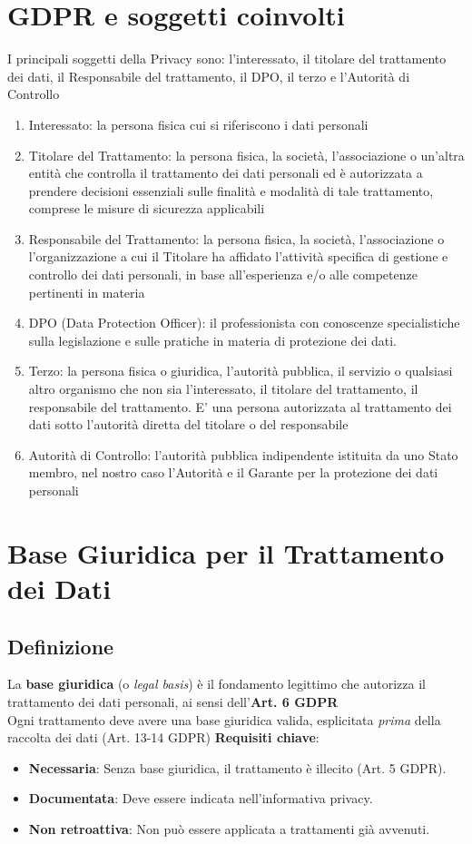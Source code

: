 \documentclass[8pt,oneside,a4paper]{article}
\begin{document}
	\section{GDPR e soggetti coinvolti}
	I  principali soggetti della Privacy sono: l’interessato, il titolare del trattamento dei dati, il Responsabile del trattamento, il DPO, il terzo e l’Autorità di Controllo
	\begin{enumerate}
		\item Interessato: la persona fisica cui si riferiscono i dati personali
		\item Titolare del Trattamento: la persona fisica, la società, l’associazione o un’altra entità che controlla il trattamento dei dati personali ed è autorizzata a prendere decisioni essenziali sulle finalità e modalità di tale trattamento, comprese le misure di sicurezza applicabili
		\item Responsabile del Trattamento: la persona fisica, la società, l’associazione o l’organizzazione a cui il Titolare ha affidato l’attività specifica di gestione e controllo dei dati personali, in base all’esperienza e/o alle competenze pertinenti in materia
		\item DPO (Data Protection Officer): il professionista con conoscenze specialistiche sulla legislazione e sulle pratiche in materia di protezione dei dati.
		\item Terzo: la persona fisica o giuridica, l’autorità pubblica, il servizio o qualsiasi altro organismo che non sia l’interessato, il titolare del trattamento, il responsabile del trattamento. E’ una persona autorizzata al trattamento dei dati sotto l’autorità diretta del titolare o del responsabile
		\item Autorità di Controllo: l’autorità pubblica indipendente istituita da uno Stato membro, nel nostro caso l’Autorità e il Garante per la protezione dei dati personali
	\end{enumerate}
	\section{Base Giuridica per il Trattamento dei Dati}
	\subsection{Definizione}
	La \textbf{base giuridica} (o \textit{legal basis}) è il fondamento legittimo che autorizza il trattamento dei dati personali, ai sensi dell’\textbf{Art. 6 GDPR}\\
	Ogni trattamento deve avere una base giuridica valida, esplicitata \textit{prima} della raccolta dei dati (Art. 13-14 GDPR)
	\noindent \textbf{Requisiti chiave}:
	\begin{itemize}
		\item \textbf{Necessaria}: Senza base giuridica, il trattamento è illecito (Art. 5 GDPR).
		\item \textbf{Documentata}: Deve essere indicata nell’informativa privacy.
		\item \textbf{Non retroattiva}: Non può essere applicata a trattamenti già avvenuti.
	\end{itemize}
\end{document}
